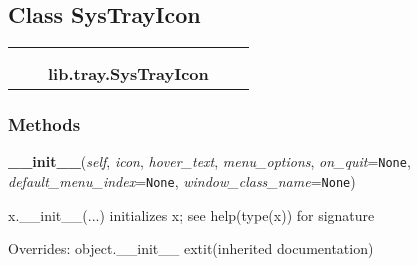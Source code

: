 
\subsection{Class SysTrayIcon}

    \label{lib:tray:SysTrayIcon}
\begin{tabular}{cccccc}
\multicolumn{2}{r}{\settowidth{\BCL}{object}\multirow{2}{\BCL}{object}}
&&
  \\\cline{3-3}
  &&\multicolumn{1}{c|}{}
&&
  \\
&&\multicolumn{2}{l}{\textbf{lib.tray.SysTrayIcon}}
\end{tabular}



  \subsubsection{Methods}

    \vspace{0.5ex}

\hspace{.8\funcindent}\begin{boxedminipage}{\funcwidth}

    \raggedright \textbf{\_\_init\_\_}(\textit{self}, \textit{icon}, \textit{hover\_text}, \textit{menu\_options}, \textit{on\_quit}={\tt None}, \textit{default\_menu\_index}={\tt None}, \textit{window\_class\_name}={\tt None})

\setlength{\parskip}{2ex}
    x.\_\_init\_\_(...) initializes x; see help(type(x)) for signature

\setlength{\parskip}{1ex}
      Overrides: object.\_\_init\_\_ 	extit{(inherited documentation)}

    \end{boxedminipage}

    \label{lib:tray:SysTrayIcon:refresh_icon}

